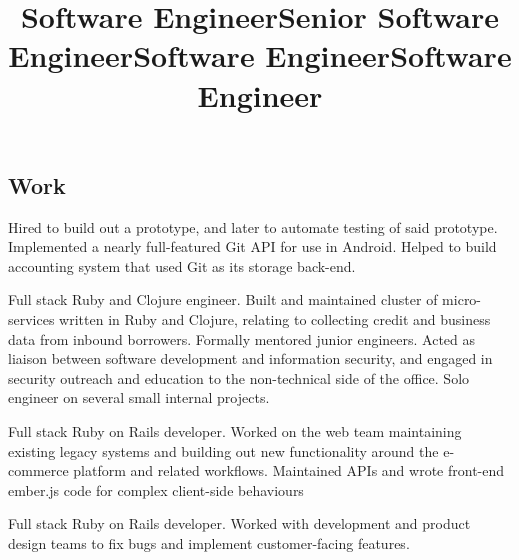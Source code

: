 \documentclass[margin,line,letterpaper]{resume}
\begin{document}
\begin{resume}
  \section{\mysidestyle Work}

  \title{\bf Software Engineer}
  \location{}
  \begin{position}
    Hired to build out a prototype, and later to automate testing of
    said prototype. Implemented a nearly full-featured Git API for use
    in Android. Helped to build accounting system that used Git as
    its storage back-end.
  \end{position}

  \title{\bf Senior Software Engineer}
  \location{}
  \begin{position}
    Full stack Ruby and Clojure engineer. Built and maintained
    cluster of micro-services written in Ruby and Clojure, relating
    to collecting credit and business data from inbound borrowers.
    Formally mentored junior engineers. Acted as liaison between
    software development and information security, and engaged in
    security outreach and education to the non-technical side of
    the office. Solo engineer on several small internal projects.
  \end{position}

  \title{\bf Software Engineer}
  \location{}
  \begin{position}
    Full stack Ruby on Rails developer. Worked on the web team
    maintaining existing legacy systems and building out new
    functionality around the e-commerce platform and related
    workflows. Maintained APIs and wrote front-end ember.js code
    for complex client-side behaviours
  \end{position}

  \title{\bf Software Engineer}
  \location{}
  \begin{position}
    Full stack Ruby on Rails developer. Worked with development and
    product design teams to fix bugs and implement customer-facing
    features.
  \end{position}

\end{resume}
\end{document}
